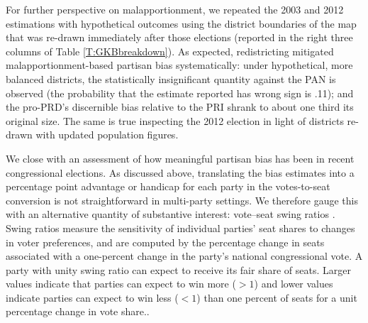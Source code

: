 \documentclass[letter,12pt]{article}
\begin{document}

For further perspective on malapportionment, we repeated the 2003 and 2012 estimations with hypothetical outcomes using the district boundaries of the map that was re-drawn immediately after those elections (reported in the right three columns of Table \ref{T:GKBbreakdown}). As expected, redistricting mitigated malapportionment-based partisan bias systematically: under hypothetical, more balanced districts, the statistically insignificant quantity against the PAN is observed (the probability that the estimate reported has wrong sign is .11); and the pro-PRD's discernible bias relative to the PRI shrank to about one third its original size. The same is true inspecting the 2012 election in light of districts re-drawn with updated population figures. 


We close with an assessment of how meaningful partisan bias has been in recent congressional elections. As discussed above, translating the bias estimates into a percentage point advantage or handicap for each party in the votes-to-seat conversion is not straightforward in multi-party settings. We therefore gauge this with an alternative quantity of substantive interest: vote--seat swing ratios \citep{tufte1973seatsVotes,niemi.fett1986swing}. Swing ratios measure the sensitivity of individual parties' seat shares to changes in voter preferences, and are computed by the percentage change in seats associated with a one-percent change in the party's national congressional vote. A party with unity swing ratio can expect to receive its fair share of seats. Larger values indicate that parties can expect to win more ($>1$) and lower values indicate parties can expect to win less ($<1$) than one percent of seats for a unit percentage change in vote share.\citep[We rule out negative swing ratios corresponding to a party losing seats as it wins votes; for violations of the monotonicity principle of representation, see][]{balinskiYoung2001FairRep}. 
\end{document}
